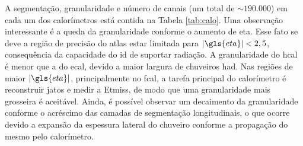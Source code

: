 A segmentação, granularidade e número de canais (um total de $\sim190.000$) 
em cada um dos calorímetros está contida
na Tabela \ref{tab:calo}. Uma observação interessante é a queda da granularidade
conforme o aumento de \gls{eta}. Esse fato se deve a região de precisão do 
\gls{atlas} estar limitada para $|\gls{eta}| < 2,5$, consequência da capacidade do
\gls{id} de suportar radiação. A granularidade do
\gls{hcal} é menor que a do \gls{ecal}, devido a maior largura de chuveiros
\gls{had}. Nas regiões de maior $|\gls{eta}|$, principalmente no \gls{fcal}, 
a tarefa principal do calorímetro é reconstruir jatos e medir a
\gls{Etmiss}, de modo que uma granularidade mais grosseira é aceitável.
Ainda, é possível observar um decaimento da granularidade conforme o acréscimo
das camadas de segmentação longitudinais, o que ocorre devido a expansão da
espessura lateral do chuveiro conforme a propagação do mesmo pelo calorímetro.

